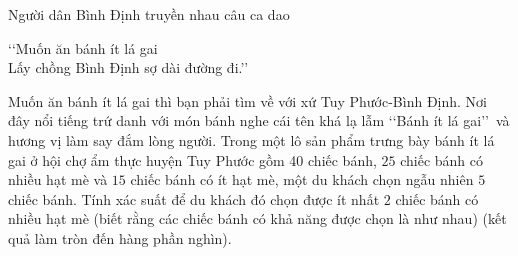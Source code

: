 \begin{bt}%
Người dân Bình Định truyền nhau câu ca dao
\begin{center}
\lq\lq Muốn ăn bánh ít lá gai\\
Lấy chồng Bình Định sợ dài đường đi.\rq\rq
\end{center}
Muốn ăn bánh ít lá gai thì bạn phải tìm về với xứ Tuy Phước-Bình Định. Nơi đây nổi tiếng trứ danh với món bánh nghe cái tên khá lạ lẫm \lq\lq Bánh ít lá gai\rq\rq\, và hương vị làm say đắm lòng người. Trong một lô sản phẩm trưng bày bánh ít lá gai ở hội chợ ẩm thực huyện Tuy Phước gồm 40 chiếc bánh, $25$ chiếc bánh có nhiều hạt mè và $15$ chiếc bánh có ít hạt mè, một du khách chọn ngẫu nhiên $5$ chiếc bánh. Tính xác suất để du khách đó chọn được ít nhất $2$ chiếc bánh có nhiều hạt mè (biết rằng các chiếc bánh có khả năng được chọn là như nhau) (kết quả làm tròn đến hàng phần nghìn).
\end{bt}


